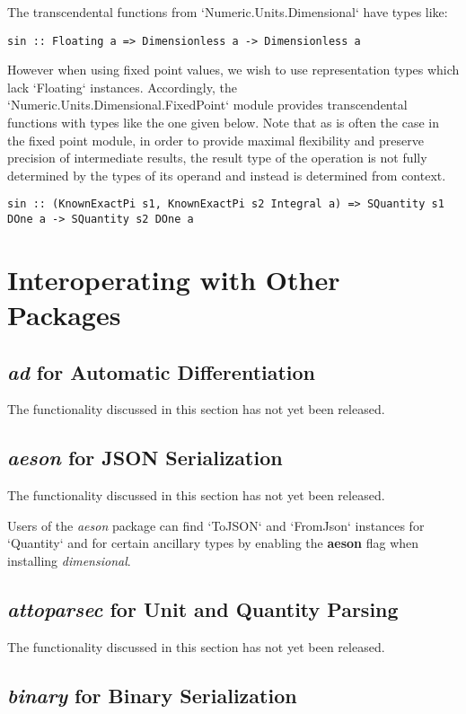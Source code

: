 \documentclass[11pt]{report}
\newcommand{\packagename}[1]{\textit{#1}}
\newcommand{\thispackage}{\packagename{dimensional}}
\newcommand{\submodule}[1]{`Numeric.Units.Dimensional.{#1}`}
\newcommand{\flag}[1]{\textbf{#1}}
\newcommand{\prerelease}{\begin{framed}
The functionality discussed in this section has not yet been released.
\end{framed}}
\begin{document}
The transcendental functions from `Numeric.Units.Dimensional` have types like:

\begin{lstlisting}
sin :: Floating a => Dimensionless a -> Dimensionless a
\end{lstlisting}

However when using fixed point values, we wish to use representation types which lack `Floating` instances. Accordingly,
the \submodule{FixedPoint} module provides transcendental functions with types like the one given below.
Note that as is often the case in the fixed point module, in order to provide maximal flexibility and preserve precision of
intermediate results, the result type of the operation is not fully determined by the types of its operand and instead is
determined from context.

\begin{lstlisting}
sin :: (KnownExactPi s1, KnownExactPi s2 Integral a) => SQuantity s1 DOne a -> SQuantity s2 DOne a
\end{lstlisting}

\chapter{Interoperating with Other Packages}

\section{\packagename{ad} for Automatic Differentiation}

\prerelease{}

\section{\packagename{aeson} for JSON Serialization}

\prerelease{}

Users of the \packagename{aeson} package can find `ToJSON`
and `FromJson` instances for `Quantity` and for certain ancillary types by
enabling the \flag{aeson} flag when installing \thispackage{}.

\section{\packagename{attoparsec} for Unit and Quantity Parsing}

\prerelease{}

\section{\packagename{binary} for Binary Serialization}
\end{document}
